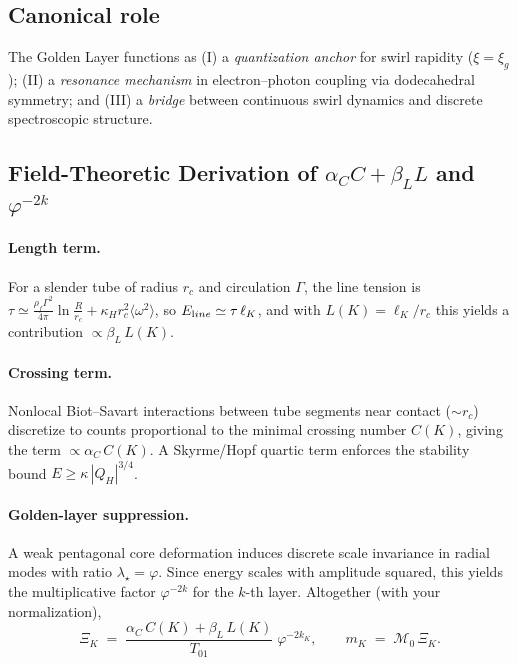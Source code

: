 \documentclass[smallextended]{svjour3}       %
\providecommand{\rc}{r_c}
\newcommand{\rhoF}{\rho_{\!f}}      %
\begin{document}
	\subsection{Canonical role}
	The Golden Layer functions as (I) a \emph{quantization anchor} for swirl rapidity (\(\xi=\xi_g\)); (II) a \emph{resonance mechanism} in electron–photon coupling via dodecahedral symmetry; and (III) a \emph{bridge} between continuous swirl dynamics and discrete spectroscopic structure.

	\subsection{Field-Theoretic Derivation of \texorpdfstring{$\alpha_C C+\beta_{\!L} L$}{alpha_C C + beta_L L} and \texorpdfstring{$\varphi^{-2k}$}{phi^{-2k}}}
	\paragraph*{Length term.}
	For a slender tube of radius \(\rc\) and circulation \(\Gamma\), the line tension is
	\(
	\tau\simeq \frac{\rhoF\Gamma^2}{4\pi}\ln\!\frac{R}{\rc}+\kappa_H \rc^2\langle\omega^2\rangle
	\),
	so \(E_{\textrm line}\simeq \tau\,\ell_K\),
	and with \(L(K)=\ell_K/\rc\) this yields a contribution \(\propto \beta_{\!L}\,L(K)\).

	\paragraph*{Crossing term.}
	Nonlocal Biot--Savart interactions between tube segments near contact (\(\sim \rc\)) discretize to counts proportional to the minimal crossing number \(C(K)\), giving
	the term \(\propto \alpha_C\,C(K)\). A Skyrme/Hopf quartic term enforces the stability bound \(E\ge \kappa\,|Q_H|^{3/4}\).

	\paragraph*{Golden-layer suppression.}
	A weak pentagonal core deformation induces discrete scale invariance in radial modes with ratio \(\lambda_\star=\varphi\).
	Since energy scales with amplitude squared, this yields the multiplicative factor \(\varphi^{-2k}\) for the \(k\)-th layer.
	Altogether (with your normalization),
	\begin{equation}
		\Xi_K \;=\; \frac{\alpha_C\,C(K)+\beta_{\!L}\,L(K)}{T_{01}}\;\varphi^{-2k_K},
		\qquad
		m_K \;=\; \mathcal{M}_0\,\Xi_K .
	\end{equation}
\end{document}
